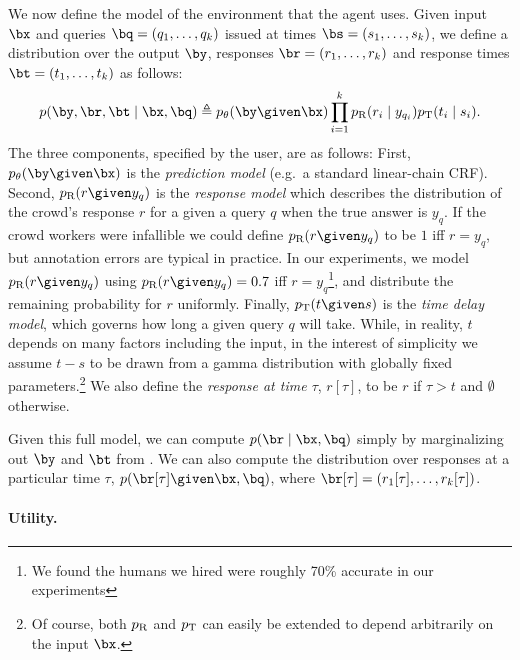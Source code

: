 We now define the model of the environment that the agent uses.
Given input $\bx$ and queries $\bq = (q_1, \dots, q_k)$ issued at times $\bs = (s_1, \dots, s_k)$,
we define a distribution over the output $\by$, responses $\br = (r_1, \dots, r_k)$
and response times $\bt = (t_1, \dots, t_k)$ as follows:
\begin{align}
  \label{eqn:dynamics}
p(\by, \br, \bt \mid \bx, \bq) \eqdef \p(\by \given \bx) \prod_{i=1}^k \presp(r_i \mid y_{q_i}) \ptime(t_i \mid s_i).
\end{align}
The three components, specified by the user, are as follows:
First, $\p(\by \given \bx)$ is the \emph{prediction model} (e.g.\ a standard linear-chain CRF).
Second, $\presp(r \given y_q)$ is the \emph{response model} which describes the distribution of the crowd's response $r$ for a given a query $q$ when the true answer is $y_q$.
%
If the crowd workers were infallible we could define $\presp(r \given y_q)$ to be $1$ iff $r = y_q$, but annotation errors are typical in practice. 
In our experiments, we model $\presp(r \given y_q)$ using $\presp(r \given y_q) = 0.7$ iff $r = y_q$\footnote{ We found the humans we hired were roughly 70\% accurate in our experiments}, and distribute the remaining probability for $r$ uniformly.
%
Finally, $\ptime(t \given s)$ is the \emph{time delay model}, which governs how long a given query $q$ will take. While, in reality, $t$ depends on many factors including the input, in the interest of simplicity we assume $t - s$ to be drawn from a gamma distribution with globally fixed parameters.\footnote{
Of course, both $p_{\text{R}}$ and $p_{\text{T}}$ can easily be extended to depend arbitrarily on the input $\bx$.}
We also define the \emph{response at time $\tau$}, $r[\tau]$, to be $r$ if $\tau > t$ and $\emptyset$ otherwise.

Given this full model, we can compute $p(\br \mid \bx, \bq)$ simply by marginalizing out $\by$ and $\bt$ from .
We can also compute the distribution over responses at a particular time $\tau$, $p(\br[\tau] \given \bx, \bq)$, where $\br[\tau] = (r_1[\tau], \ldots, r_k[\tau])$.

\paragraph{Utility.}

